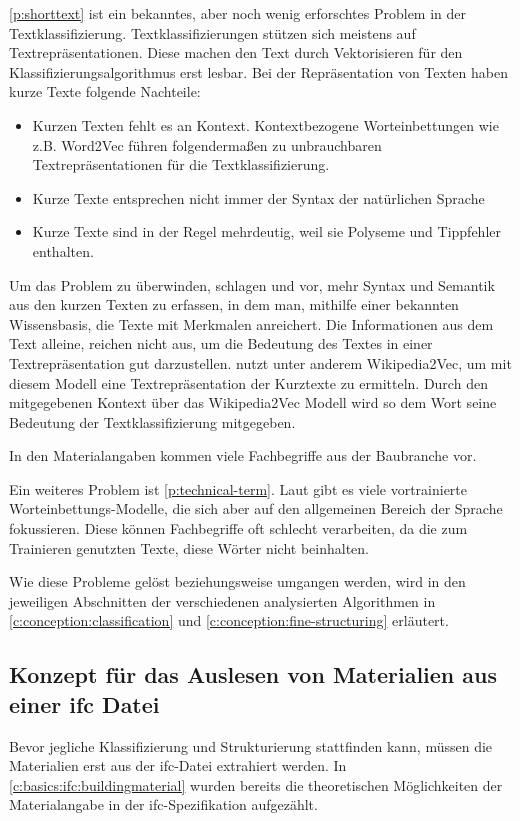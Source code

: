 \autoref{p:shorttext} ist ein bekanntes, aber noch wenig erforschtes Problem in der Textklassifizierung. Textklassifizierungen stützen sich meistens auf Textrepräsentationen. Diese machen den Text durch Vektorisieren für den Klassifizierungsalgorithmus erst lesbar. Bei der Repräsentation von Texten haben kurze Texte folgende Nachteile:

\begin{itemize}
	\setlength\itemsep{0.1em}
	\item Kurzen Texten fehlt es an Kontext. Kontextbezogene Worteinbettungen wie z.B. Word2Vec führen folgendermaßen zu unbrauchbaren Textrepräsentationen für die Textklassifizierung.
	\item Kurze Texte entsprechen nicht immer der Syntax der natürlichen Sprache
	\item Kurze Texte sind in der Regel mehrdeutig, weil sie
	Polyseme und Tippfehler enthalten. \citep[vgl.][]{ijcai2017p406}
\end{itemize}

Um das Problem zu überwinden, schlagen \cite{ijcai2017p406} und \cite{chen2019deep} vor, mehr Syntax und Semantik aus den kurzen Texten zu erfassen, in dem man, mithilfe einer bekannten Wissensbasis, die Texte mit Merkmalen anreichert. Die Informationen aus dem Text alleine, reichen nicht aus, um die Bedeutung des Textes in einer Textrepräsentation gut darzustellen.
\cite{Qingyuan2019} nutzt unter anderem Wikipedia2Vec, um mit diesem Modell eine Textrepräsentation der Kurztexte zu ermitteln. Durch den mitgegebenen Kontext über das Wikipedia2Vec Modell wird so dem Wort seine Bedeutung der Textklassifizierung mitgegeben.

\begin{problem}
	\label{p:technical-term}
	In den Materialangaben kommen viele Fachbegriffe aus der Baubranche vor.
\end{problem}
Ein weiteres Problem ist \autoref{p:technical-term}. Laut \cite{nooralahzadeh2018evaluation} gibt es viele vortrainierte Worteinbettungs-Modelle, die sich aber auf den allgemeinen Bereich der Sprache fokussieren. Diese können Fachbegriffe oft schlecht verarbeiten, da die zum Trainieren genutzten Texte, diese Wörter nicht beinhalten.

Wie diese Probleme gelöst beziehungsweise umgangen werden, wird in den jeweiligen Abschnitten der verschiedenen analysierten Algorithmen in  \autoref{c:conception:classification} und \autoref{c:conception:fine-structuring} erläutert.

\subsection{Konzept für das Auslesen von Materialien aus einer \ac{ifc} Datei}
\label{c:conception:architecture:ifc-material-extraction}
Bevor jegliche Klassifizierung und Strukturierung stattfinden kann, müssen die Materialien erst aus der \ac{ifc}-Datei extrahiert werden. In \autoref{c:basics:ifc:buildingmaterial} wurden bereits die theoretischen Möglichkeiten der Materialangabe in der \ac{ifc}-Spezifikation aufgezählt.

